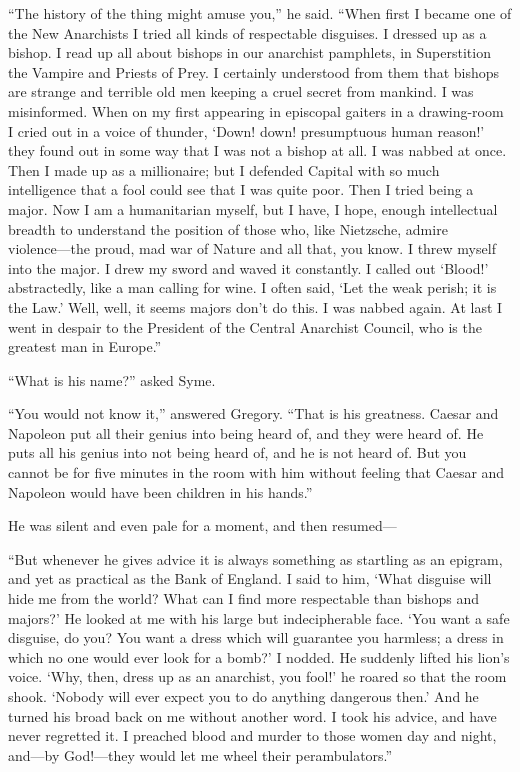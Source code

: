 “The history of the thing might amuse you,” he said. “When first I became one of the New Anarchists I tried all kinds of respectable disguises. I dressed up as a bishop. I read up all about bishops in our anarchist pamphlets, in Superstition the Vampire and Priests of Prey. I certainly understood from them that bishops are strange and terrible old men keeping a cruel secret from mankind. I was misinformed. When on my first appearing in episcopal gaiters in a drawing-room I cried out in a voice of thunder, ‘Down! down! presumptuous human reason!’ they found out in some way that I was not a bishop at all. I was nabbed at once. Then I made up as a millionaire; but I defended Capital with so much intelligence that a fool could see that I was quite poor. Then I tried being a major. Now I am a humanitarian myself, but I have, I hope, enough intellectual breadth to understand the position of those who, like Nietzsche, admire violence⁠—the proud, mad war of Nature and all that, you know. I threw myself into the major. I drew my sword and waved it constantly. I called out ‘Blood!’ abstractedly, like a man calling for wine. I often said, ‘Let the weak perish; it is the Law.’ Well, well, it seems majors don’t do this. I was nabbed again. At last I went in despair to the President of the Central Anarchist Council, who is the greatest man in Europe.”

“What is his name?” asked Syme.

“You would not know it,” answered Gregory. “That is his greatness. Caesar and Napoleon put all their genius into being heard of, and they were heard of. He puts all his genius into not being heard of, and he is not heard of. But you cannot be for five minutes in the room with him without feeling that Caesar and Napoleon would have been children in his hands.”

He was silent and even pale for a moment, and then resumed⁠—

“But whenever he gives advice it is always something as startling as an epigram, and yet as practical as the Bank of England. I said to him, ‘What disguise will hide me from the world? What can I find more respectable than bishops and majors?’ He looked at me with his large but indecipherable face. ‘You want a safe disguise, do you? You want a dress which will guarantee you harmless; a dress in which no one would ever look for a bomb?’ I nodded. He suddenly lifted his lion’s voice. ‘Why, then, dress up as an anarchist, you fool!’ he roared so that the room shook. ‘Nobody will ever expect you to do anything dangerous then.’ And he turned his broad back on me without another word. I took his advice, and have never regretted it. I preached blood and murder to those women day and night, and⁠—by God!⁠—they would let me wheel their perambulators.”

